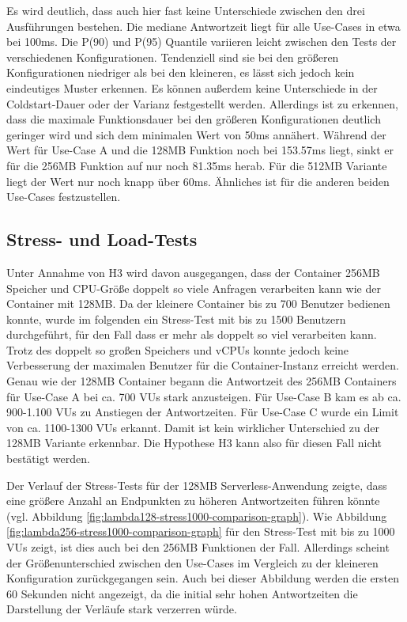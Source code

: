 Es wird deutlich, dass auch hier fast keine Unterschiede zwischen den drei Ausführungen bestehen. Die mediane Antwortzeit liegt für alle Use-Cases in etwa bei 100ms. Die P(90) und P(95) Quantile variieren leicht zwischen den Tests der verschiedenen Konfigurationen. Tendenziell sind sie bei den größeren Konfigurationen niedriger als bei den kleineren, es lässt sich jedoch kein eindeutiges Muster erkennen. Es können außerdem keine Unterschiede in der Coldstart-Dauer oder der Varianz festgestellt werden. 
Allerdings ist zu erkennen, dass die maximale Funktionsdauer bei den größeren Konfigurationen deutlich geringer wird und sich dem minimalen Wert von 50ms annähert. Während der Wert für Use-Case A und die 128MB Funktion noch bei 153.57ms liegt, sinkt er für die 256MB Funktion auf nur noch 81.35ms herab. Für die 512MB Variante liegt der Wert nur noch knapp über 60ms. Ähnliches ist für die anderen beiden Use-Cases festzustellen. 

\subsection{Stress- und Load-Tests}
Unter Annahme von H3 wird davon ausgegangen, dass der Container 256MB Speicher und CPU-Größe doppelt so viele Anfragen verarbeiten kann wie der Container mit 128MB. Da der kleinere Container bis zu 700 Benutzer bedienen konnte, wurde im folgenden ein Stress-Test mit bis zu 1500 Benutzern durchgeführt, für den Fall dass er mehr als doppelt so viel verarbeiten kann.
Trotz des doppelt so großen Speichers und vCPUs konnte jedoch keine Verbesserung der maximalen Benutzer für die Container-Instanz erreicht werden. Genau wie der 128MB Container begann die Antwortzeit des 256MB Containers für Use-Case A bei ca. 700 VUs stark anzusteigen. Für Use-Case B kam es ab ca. 900-1.100 VUs zu Anstiegen der Antwortzeiten. Für Use-Case C wurde ein Limit von ca. 1100-1300 VUs erkannt. Damit ist kein wirklicher Unterschied zu der 128MB Variante erkennbar. Die Hypothese H3 kann also für diesen Fall nicht bestätigt werden.

Der Verlauf der Stress-Tests für der 128MB Serverless-Anwendung zeigte, dass eine größere Anzahl an Endpunkten zu höheren Antwortzeiten führen könnte (vgl. Abbildung \ref{fig:lambda128-stress1000-comparison-graph}). Wie Abbildung \ref{fig:lambda256-stress1000-comparison-graph} für den Stress-Test mit bis zu 1000 VUs zeigt, ist dies auch bei den 256MB Funktionen der Fall. Allerdings scheint der Größenunterschied zwischen den Use-Cases im Vergleich zu der kleineren Konfiguration zurückgegangen sein. Auch bei dieser Abbildung werden die ersten 60 Sekunden nicht angezeigt, da die initial sehr hohen Antwortzeiten die Darstellung der Verläufe stark verzerren würde. 

